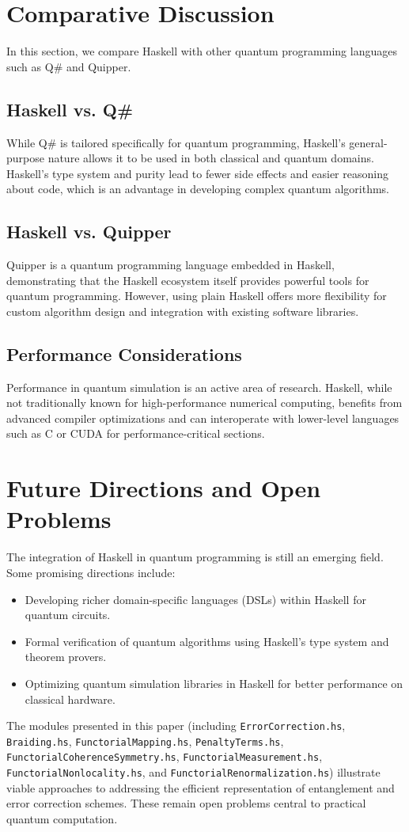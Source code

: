 \documentclass[12pt]{article}
\begin{document}
\section{Comparative Discussion}
\label{sec:discussion}
In this section, we compare Haskell with other quantum programming languages such as Q\# and Quipper.

\subsection{Haskell vs. Q\#}
While Q\# is tailored specifically for quantum programming, Haskell’s general-purpose nature allows it to be used in both classical and quantum domains. Haskell’s type system and purity lead to fewer side effects and easier reasoning about code, which is an advantage in developing complex quantum algorithms.

\subsection{Haskell vs. Quipper}
Quipper is a quantum programming language embedded in Haskell, demonstrating that the Haskell ecosystem itself provides powerful tools for quantum programming. However, using plain Haskell offers more flexibility for custom algorithm design and integration with existing software libraries.

\subsection{Performance Considerations}
Performance in quantum simulation is an active area of research. Haskell, while not traditionally known for high-performance numerical computing, benefits from advanced compiler optimizations and can interoperate with lower-level languages such as C or CUDA for performance-critical sections.

\section{Future Directions and Open Problems}
The integration of Haskell in quantum programming is still an emerging field. Some promising directions include:
\begin{itemize}
    \item Developing richer domain-specific languages (DSLs) within Haskell for quantum circuits.
    \item Formal verification of quantum algorithms using Haskell’s type system and theorem provers.
    \item Optimizing quantum simulation libraries in Haskell for better performance on classical hardware.
\end{itemize}
The modules presented in this paper (including \texttt{ErrorCorrection.hs}, \texttt{Braiding.hs}, \texttt{FunctorialMapping.hs}, \texttt{PenaltyTerms.hs}, \texttt{FunctorialCoherenceSymmetry.hs}, \texttt{FunctorialMeasurement.hs}, \texttt{FunctorialNonlocality.hs}, and \texttt{FunctorialRenormalization.hs}) illustrate viable approaches to addressing the efficient representation of entanglement and error correction schemes. These remain open problems central to practical quantum computation.
\end{document}
